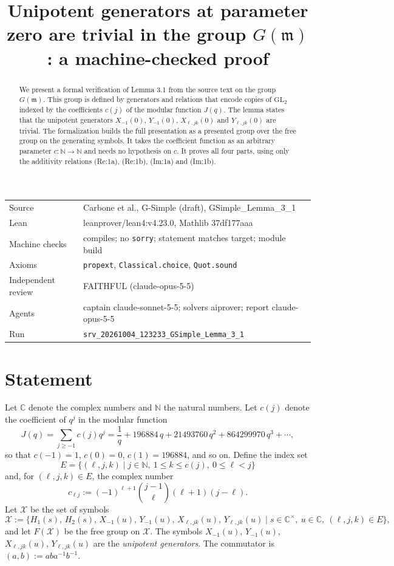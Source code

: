 \documentclass[11pt]{article}
\title{Unipotent generators at parameter zero are trivial in the group $G(\mathfrak{m})$: a machine-checked proof}
\date{}
\theoremstyle{definition}
\theoremstyle{remark}
\newcommand{\cX}{\mathcal{X}}
\newcommand{\C}{\mathbb{C}}
\newcommand{\N}{\mathbb{N}}
\begin{document}
\maketitle
\begin{abstract}
We present a formal verification of Lemma 3.1 from the source text on the group $G(\mathfrak{m})$. This group is defined by generators and relations that encode copies of $\mathrm{GL}_2$ indexed by the coefficients $c(j)$ of the modular function $J(q)$. The lemma states that the unipotent generators $X_{-1}(0)$, $Y_{-1}(0)$, $X_{\ell,jk}(0)$ and $Y_{\ell,jk}(0)$ are trivial. The formalization builds the full presentation as a presented group over the free group on the generating symbols. It takes the coefficient function as an arbitrary parameter $c\colon\mathbb{N}\to\mathbb{N}$ and needs no hypothesis on $c$. It proves all four parts, using only the additivity relations (Re:1a), (Re:1b), (Im:1a) and (Im:1b).
\end{abstract}

\begin{center}\small
\begin{tabular}{@{}ll@{}}
\toprule
Source & Carbone et al., G-Simple (draft), GSimple\_Lemma\_3\_1 \\
Lean & leanprover/lean4:v4.23.0, Mathlib 37df177aaa \\
Machine checks & compiles; no \texttt{sorry}; statement matches target; module build \\
Axioms & \texttt{propext}, \texttt{Classical.choice}, \texttt{Quot.sound} \\
Independent review & FAITHFUL (claude-opus-5-5) \\
Agents & captain claude-sonnet-5-5; solvers aiprover; report claude-opus-5-5 \\
Run & \texttt{srv\_20261004\_123233\_GSimple\_Lemma\_3\_1} \\
\bottomrule
\end{tabular}
\end{center}

\tableofcontents

\section{Statement}

Let $\C$ denote the complex numbers and $\N$ the natural numbers. Let $c(j)$ denote the coefficient of $q^j$ in the modular function
\[
J(q)=\sum_{j\geq -1}c(j)q^j=\frac{1}{q}+196884\,q+21493760\,q^2+864299970\,q^3+\cdots,
\]
so that $c(-1)=1$, $c(0)=0$, $c(1)=196884$, and so on. Define the index set
\[
E=\{(\ell,j,k)\mid j\in\N,\ 1\leq k\leq c(j),\ 0\leq \ell<j\}
\]
and, for $(\ell,j,k)\in E$, the complex number
\[
c_{\ell j}:=(-1)^{\ell+1}\binom{j-1}{\ell}(\ell+1)(j-\ell).
\]
Let $\cX$ be the set of symbols
\[
\cX:=\{H_1(s),\,H_2(s),\,X_{-1}(u),\,Y_{-1}(u),\,X_{\ell,jk}(u),\,Y_{\ell,jk}(u)\mid s\in\C^\times,\ u\in\C,\ (\ell,j,k)\in E\},
\]
and let $F(\cX)$ be the free group on $\cX$. The symbols $X_{-1}(u)$, $Y_{-1}(u)$, $X_{\ell,jk}(u)$, $Y_{\ell,jk}(u)$ are the \emph{unipotent generators}. The commutator is $(a,b):=aba^{-1}b^{-1}$.
\end{document}
